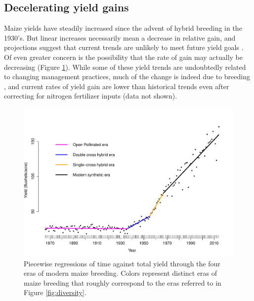 \documentclass[draft,12pt]{article}
\begin{document}
\subsection*{Decelerating yield gains} 

Maize yields have steadily increased since the advent of hybrid breeding in the 1930's.
But linear increases necessarily mean a decrease in relative gain, and projections suggest that current trends are unlikely to meet future yield goals \citep{grassini2013distinguishing}. 
Of even greater concern is the possibility that the rate of gain may actually be decreasing (Figure \ref{fig:piecewise}).
While some of these yield trends are undoubtedly related to changing management practices, much of the change is indeed due to breeding \citep{Duvick:2001fy}, and current rates of yield gain are lower than historical trends even after correcting for nitrogen fertilizer inputs (data not shown). 

\begin{figure}
\includegraphics[width=0.6\linewidth]{yield.pdf}
\caption{Piecewise regressions of time against total yield through the four eras of modern maize breeding. Colors represent distinct eras of maize breeding that roughly correspond to the eras  referred to in Figure \ref{fig:diversity}.} 
\label{fig:piecewise}
\end{figure}
 
%
\end{document}
